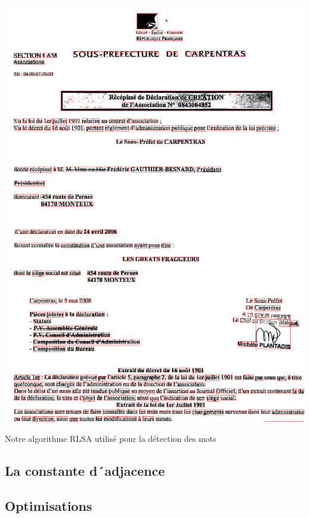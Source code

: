 \begin{center}
  \includegraphics{Pictures/3words.png}
  \caption{Notre algorithme RLSA utilisé pour la détection des mots}
\end{center}

\subsection{La constante d´adjacence}


\subsection{Optimisations}

